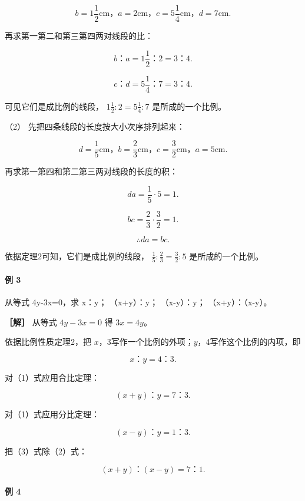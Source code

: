 \[
b = 1 \frac {1}{2} \mathrm{cm}\text{，} a = 2 \mathrm{cm}\text{，} c = 5 \frac {1}{4} \mathrm{cm}\text{，} d = 7 \mathrm{cm}.
\]

再求第一第二和第三第四两对线段的比：

\[
b\text{：} a = 1 \frac {1}{2}\text{：} 2 = 3\text{：} 4.
\]

\[
c\text{：} d = 5 \frac {1}{4}\text{：} 7 = 3\text{：} 4.
\]

可见它们是成比例的线段， \(1\frac{1}{2}:2=5\frac{1}{4}:7\)
是所成的一个比例。

（2） 先把四条线段的长度按大小次序排列起来：

\[
d = \frac {1}{5} \mathrm{cm}\text{，} b = \frac {2}{3} \mathrm{cm}\text{，} c = \frac {3}{2} \mathrm{cm}\text{，} a = 5 \mathrm{cm}.
\]

再求第一第四和第二第三两对线段的长度的积：

\[
d a = \frac {1}{5} \cdot 5 = 1.
\]

\[
b c = \frac {2}{3} \cdot \frac {3}{2} = 1.
\]

\[
\therefore d a = b c.
\]

依据定理2可知，它们是成比例的线段，
\(\frac{1}{5}:\frac{2}{3} = \frac{3}{2}:5\) 是所成的一个比例。

\paragraph{例 3}

从等式 4y-3x=0，求 x：y； （x+y）：y； （x-y）：y； （x+y）：（x-y）。

\textbf{［解］} 从等式 \(4y - 3x = 0\) 得 \(3x = 4y\)。

依据比例性质定理2，把
\(x\)，3写作一个比例的外项；\(y\)，4写作这个比例的内项，即

\[
x\text{：} y = 4\text{：} 3. \tag {1}
\]

对（1）式应用合比定理：

\[
(x + y)\text{：} y = 7\text{：} 3. \tag {2}
\]

对（1）式应用分比定理：

\[
(x - y)\text{：} y = 1\text{：} 3. \tag {3}
\]

把（3）式除（2）式：

\[
(x + y)\text{：} (x - y) = 7\text{：} 1.
\]

\paragraph{例 4}

